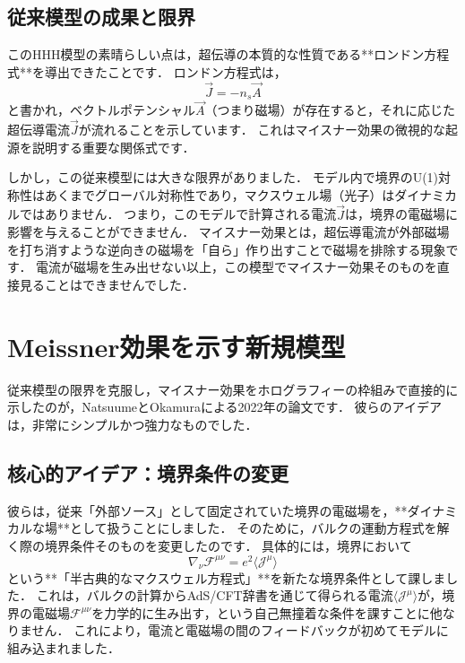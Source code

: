 \documentclass[b5paper,11pt,dvipdfmx]{jsarticle}
\numberwithin{equation}{section}
\theoremstyle{definition}
\begin{document}
\subsection{従来模型の成果と限界}

このHHH模型の素晴らしい点は，超伝導の本質的な性質である**ロンドン方程式**を導出できたことです\cite{Hartnoll08b}．
ロンドン方程式は，
$$ \vec{J} = -n_s \vec{A} $$
と書かれ，ベクトルポテンシャル$\vec{A}$（つまり磁場）が存在すると，それに応じた超伝導電流$\vec{J}$が流れることを示しています．
これはマイスナー効果の微視的な起源を説明する重要な関係式です．

しかし，この従来模型には大きな限界がありました．
モデル内で境界のU(1)対称性はあくまでグローバル対称性であり，マクスウェル場（光子）はダイナミカルではありません．
つまり，このモデルで計算される電流$\vec{J}$は，境界の電磁場に影響を与えることができません．
マイスナー効果とは，超伝導電流が外部磁場を打ち消すような逆向きの磁場を「自ら」作り出すことで磁場を排除する現象です．
電流が磁場を生み出せない以上，この模型でマイスナー効果そのものを直接見ることはできませんでした．

\clearpage

\section{Meissner効果を示す新規模型}

従来模型の限界を克服し，マイスナー効果をホログラフィーの枠組みで直接的に示したのが，NatsuumeとOkamuraによる2022年の論文\cite{Natsuume22}です．
彼らのアイデアは，非常にシンプルかつ強力なものでした．

\subsection{核心的アイデア：境界条件の変更}

彼らは，従来「外部ソース」として固定されていた境界の電磁場を，**ダイナミカルな場**として扱うことにしました．
そのために，バルクの運動方程式を解く際の境界条件そのものを変更したのです．
具体的には，境界において
\begin{equation}
    \nabla_\nu \mathcal{F}^{\mu\nu} = e^2 \langle \mathcal{J}^\mu \rangle
\end{equation}
という**「半古典的なマクスウェル方程式」**を新たな境界条件として課しました．
これは，バルクの計算からAdS/CFT辞書を通じて得られる電流$\langle \mathcal{J}^\mu \rangle$が，境界の電磁場$\mathcal{F}^{\mu\nu}$を力学的に生み出す，という自己無撞着な条件を課すことに他なりません．
これにより，電流と電磁場の間のフィードバックが初めてモデルに組み込まれました．
\end{document}

